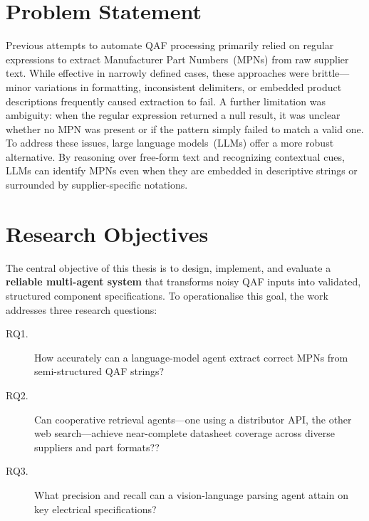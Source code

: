 \section{Problem Statement }
Previous attempts to automate QAF processing primarily relied on regular expressions to extract Manufacturer Part Numbers~(MPNs) from raw supplier text.  
While effective in narrowly defined cases, these approaches were brittle---minor variations in formatting, inconsistent delimiters, or embedded product descriptions frequently caused extraction to fail.  
A further limitation was ambiguity: when the regular expression returned a null result, it was unclear whether no MPN was present or if the pattern simply failed to match a valid one.  
To address these issues, large language models~(LLMs) offer a more robust alternative.  
By reasoning over free-form text and recognizing contextual cues, LLMs can identify MPNs even when they are embedded in descriptive strings or surrounded by supplier-specific notations.

\section{Research Objectives }
The central objective of this thesis is to design, implement, and evaluate a \textbf{reliable multi-agent system} that transforms noisy QAF inputs into validated, structured component specifications.  
To operationalise this goal, the work addresses three research questions:

\begin{description}
  \item[RQ1.] How accurately can a language-model agent extract correct MPNs from semi-structured QAF strings?
  \item[RQ2.] Can cooperative retrieval agents—one using a distributor API, the other web search—achieve near-complete datasheet coverage across diverse suppliers and part formats??
  \item[RQ3.] What precision and recall can a vision-language parsing agent attain on key electrical specifications?
\end{description}

